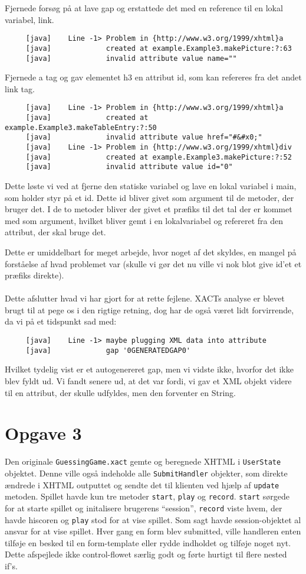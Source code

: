 \documentclass[a4paper,10pt]{article}
\begin{document}
Fjernede forsøg på at lave gap og erstattede det med en reference til en lokal variabel, link.
\begin{lstlisting}
     [java]    Line -1> Problem in {http://www.w3.org/1999/xhtml}a 
     [java]             created at example.Example3.makePicture:?:63
     [java]             invalid attribute value name=""
\end{lstlisting}
Fjernede a tag og gav elementet h3 en attribut id, som kan refereres fra det andet link tag.
\begin{lstlisting}
     [java]    Line -1> Problem in {http://www.w3.org/1999/xhtml}a 
     [java]             created at example.Example3.makeTableEntry:?:50
     [java]             invalid attribute value href="#&#x0;"
     [java]    Line -1> Problem in {http://www.w3.org/1999/xhtml}div 
     [java]             created at example.Example3.makePicture:?:52
     [java]             invalid attribute value id="0"
\end{lstlisting}
Dette løste vi ved at fjerne den statiske variabel og lave en lokal variabel i main, som holder styr på et id. Dette id bliver givet som argument til de metoder, der bruger det. I de to metoder bliver der givet et præfiks til det tal der er kommet med som argument, hvilket bliver gemt i en lokalvariabel og refereret fra den attribut, der skal bruge det.

Dette er umiddelbart for meget arbejde, hvor noget af det skyldes, en mangel på forståelse af hvad problemet var (skulle vi gør det nu ville vi nok blot give id'et et præfiks direkte).\\\\
Dette afslutter hvad vi har gjort for at rette fejlene. XACTs analyse er blevet brugt til at pege os i den rigtige retning, dog har de også været lidt forvirrende, da vi på et tidspunkt sad med:
\begin{lstlisting}
     [java]    Line -1> maybe plugging XML data into attribute
     [java]             gap '0GENERATEDGAP0'
\end{lstlisting} 
Hvilket tydelig vist er et autogenereret gap, men vi vidste ikke, hvorfor det ikke blev fyldt ud. Vi fandt senere ud, at det var fordi, vi gav et XML objekt videre til en attribut, der skulle udfyldes, men den forventer en String.
\section*{Opgave 3}
Den originale \texttt{GuessingGame.xact} gemte og beregnede XHTML i \texttt{UserState} objektet. Denne ville også indeholde alle \texttt{SubmitHandler} objekter, som direkte ændrede i XHTML outputtet og sendte det til klienten ved hjælp af \texttt{update} metoden. Spillet havde kun tre metoder \texttt{start}, \texttt{play} og \texttt{record}. \texttt{start} sørgede for at starte spillet og initalisere brugerens ``session'', \texttt{record} viste hvem, der havde hiscoren og \texttt{play} stod for at vise spillet. Som sagt havde session-objektet al ansvar for at vise spillet. Hver gang en form blev submitted, ville handleren enten tilføje en besked til en form-template eller rydde indholdet og tilføje noget nyt. Dette afspejlede ikke control-flowet særlig godt og førte hurtigt til flere nested if's. 
\end{document}
